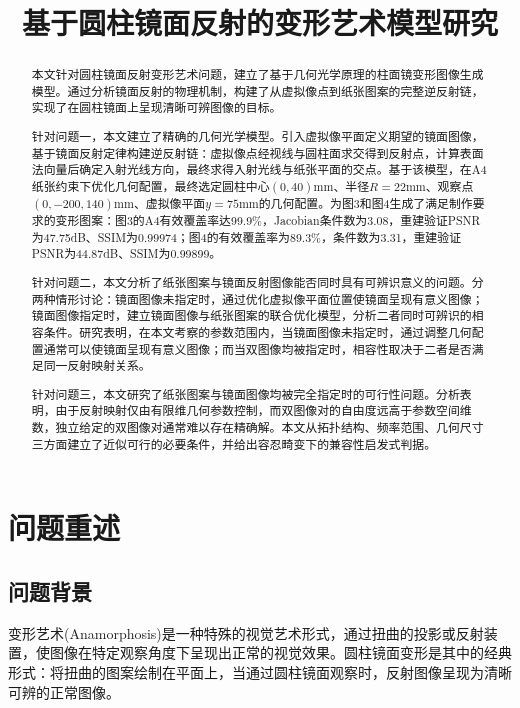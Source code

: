 \documentclass[withoutpreface]{cumcmthesis}
\title{基于圆柱镜面反射的变形艺术模型研究}
\begin{document}
\maketitle

\begin{abstract}
本文针对圆柱镜面反射变形艺术问题，建立了基于几何光学原理的柱面镜变形图像生成模型。通过分析镜面反射的物理机制，构建了从虚拟像点到纸张图案的完整逆反射链，实现了在圆柱镜面上呈现清晰可辨图像的目标。

针对问题一，本文建立了精确的几何光学模型。引入虚拟像平面定义期望的镜面图像，基于镜面反射定律构建逆反射链：虚拟像点经视线与圆柱面求交得到反射点，计算表面法向量后确定入射光线方向，最终求得入射光线与纸张平面的交点。基于该模型，在A4纸张约束下优化几何配置，最终选定圆柱中心$(0,40)$mm、半径$R=22$mm、观察点$(0,-200,140)$mm、虚拟像平面$y=75$mm的几何配置。为图3和图4生成了满足制作要求的变形图案：图3的A4有效覆盖率达99.9\%，Jacobian条件数为3.08，重建验证PSNR为47.75dB、SSIM为0.99974；图4的有效覆盖率为89.3\%，条件数为3.31，重建验证PSNR为44.87dB、SSIM为0.99899。

针对问题二，本文分析了纸张图案与镜面反射图像能否同时具有可辨识意义的问题。分两种情形讨论：镜面图像未指定时，通过优化虚拟像平面位置使镜面呈现有意义图像；镜面图像指定时，建立镜面图像与纸张图案的联合优化模型，分析二者同时可辨识的相容条件。研究表明，在本文考察的参数范围内，当镜面图像未指定时，通过调整几何配置通常可以使镜面呈现有意义图像；而当双图像均被指定时，相容性取决于二者是否满足同一反射映射关系。

针对问题三，本文研究了纸张图案与镜面图像均被完全指定时的可行性问题。分析表明，由于反射映射仅由有限维几何参数控制，而双图像对的自由度远高于参数空间维数，独立给定的双图像对通常难以存在精确解。本文从拓扑结构、频率范围、几何尺寸三方面建立了近似可行的必要条件，并给出容忍畸变下的兼容性启发式判据。

\end{abstract}

\section{问题重述}

\subsection{问题背景}

变形艺术(Anamorphosis)是一种特殊的视觉艺术形式，通过扭曲的投影或反射装置，使图像在特定观察角度下呈现出正常的视觉效果。圆柱镜面变形是其中的经典形式：将扭曲的图案绘制在平面上，当通过圆柱镜面观察时，反射图像呈现为清晰可辨的正常图像。
\end{document}
